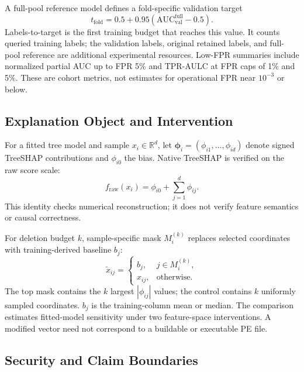 A full-pool reference model defines a fold-specific validation target
\begin{equation}
t_{\mathrm{fold}}=0.5+0.95\left(
\mathrm{AUC}^{\mathrm{full}}_{\mathrm{val}}-0.5\right).
\label{eq:target}
\end{equation}
Labels-to-target is the first training budget that reaches this value. It counts
queried training labels; the validation labels, original retained labels, and
full-pool reference are additional experimental resources. Low-FPR summaries
include normalized partial AUC up to FPR 5\% and TPR-AULC at FPR caps of 1\% and
5\%. These are cohort metrics, not estimates for operational FPR near
$10^{-3}$ or below.

\subsection{Explanation Object and Intervention}

For a fitted tree model and sample $x_i\in\mathbb{R}^d$, let
$\boldsymbol{\phi}_i=(\phi_{i1},\ldots,\phi_{id})$ denote signed TreeSHAP
contributions and $\phi_{i0}$ the bias. Native TreeSHAP is verified on the raw
score scale:
\begin{equation}
f_{\mathrm{raw}}(x_i)=\phi_{i0}+\sum_{j=1}^{d}\phi_{ij}.
\label{eq:additivity}
\end{equation}
This identity checks numerical reconstruction; it does not verify feature
semantics or causal correctness.

For deletion budget $k$, sample-specific mask $M_i^{(k)}$ replaces selected
coordinates with training-derived baseline $b_j$:
\begin{equation}
\widetilde{x}_{ij}=\begin{cases}
b_j,&j\in M_i^{(k)},\\
x_{ij},&\text{otherwise}.
\end{cases}
\label{eq:mask}
\end{equation}
The top mask contains the $k$ largest $|\phi_{ij}|$ values; the control contains
$k$ uniformly sampled coordinates. $b_j$ is the training-column mean or median.
The comparison estimates fitted-model sensitivity under two feature-space
interventions. A modified vector need not correspond to a buildable or
executable PE file.

\subsection{Security and Claim Boundaries}

